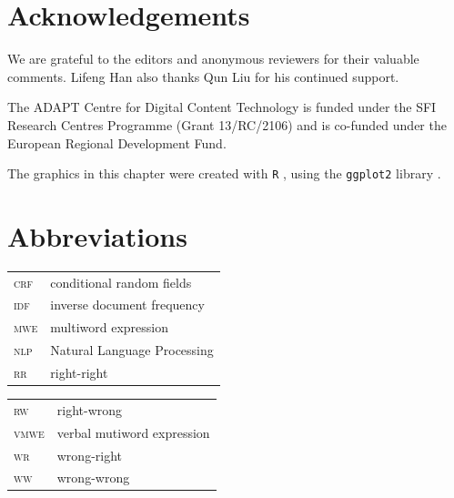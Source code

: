 \documentclass[output=paper
,modfonts
,nonflat]{langsci/langscibook}
\begin{document}
\section*{Acknowledgements}

We are grateful to the editors and anonymous reviewers for their valuable comments. Lifeng Han also thanks Qun Liu for his continued support. 

The ADAPT Centre for Digital Content Technology is funded under the SFI Research Centres Programme (Grant 13/RC/2106) and is co-funded under the European Regional Development Fund.



The graphics in this chapter were created with \texttt{R} \citep{R}, using the \texttt{ggplot2} library \citep{ggplot2}.


\section*{Abbreviations}

   \begin{tabularx}{.48\textwidth}{ll}
    \textsc{crf} & conditional random fields\\
   \textsc{idf}  & inverse document frequency\\  \textsc{mwe}  & multiword expression\\
  \textsc{nlp}  & Natural Language Processing\\
 \textsc{rr}  & right-right\\
      \end{tabularx}
      \begin{tabularx}{.48\textwidth}{ll}
 \textsc{rw}  & right-wrong\\
   \textsc{vmwe}  & verbal mutiword expression\\  \textsc{wr}  & wrong-right\\
  \textsc{ww}  & wrong-wrong\\
  \end{tabularx}


{\sloppy
\printbibliography[heading=subbibliography,notkeyword=this]
}
\end{document}
